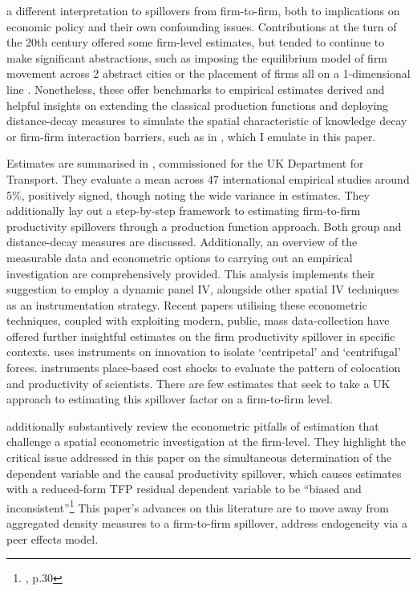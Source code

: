 a different interpretation to spillovers from firm-to-firm, both to implications on
economic policy and their own confounding issues.
Contributions at the turn of the 20th century offered some firm-level estimates,
but tended to continue to make significant abstractions,
such as imposing the equilibrium model of firm movement across 2 abstract cities or
the placement of firms all on a 1-dimensional line \cite{Fujita1982, Ciccone1996, Desmet2010}.
Nonetheless, these offer benchmarks to empirical estimates derived and
helpful insights on extending the classical production functions
and deploying distance-decay measures to simulate the spatial characteristic
of knowledge decay or firm-firm interaction barriers, such as in \cite{Lucas2002},
which I emulate in this paper.
\par
Estimates are summarised in \cite{Graham2018}, commissioned for the UK Department for Transport.
They evaluate a mean across 47 international empirical studies around 5\%,
positively signed, though noting the wide variance in estimates.
They additionally lay out a step-by-step framework to estimating firm-to-firm productivity spillovers
through a production function approach. Both group and distance-decay measures are discussed.
Additionally, an overview of the measurable data and econometric options to carrying out an empirical investigation
are comprehensively provided.
This analysis implements their suggestion to employ a dynamic panel IV,
alongside other spatial IV techniques as an instrumentation strategy.
Recent papers utilising these econometric techniques, coupled with exploiting
modern, public, mass data-collection have offered further insightful estimates
on the firm productivity spillover in specific contexts.
\cite{Bloom2013} uses instruments on innovation to isolate `centripetal' and `centrifugal' forces.
\cite{Gruber2023} instruments place-based cost shocks to evaluate the pattern of colocation and productivity of scientists.
There are few estimates that seek to take a UK approach to estimating this spillover factor
on a firm-to-firm level.
\par
\cite{Graham2018} additionally substantively review the econometric pitfalls of estimation
that challenge a spatial econometric investigation at the firm-level.
They highlight the critical issue addressed in this paper
on the simultaneous determination of the dependent variable and the causal productivity spillover,
which causes estimates with a reduced-form TFP residual dependent variable to be
``biased and inconsistent''\footnote{\cite{Graham2018}, p.30}
This paper's advances on this literature are
to move away from aggregated density measures to a firm-to-firm spillover,
address endogeneity via a peer effects model.

